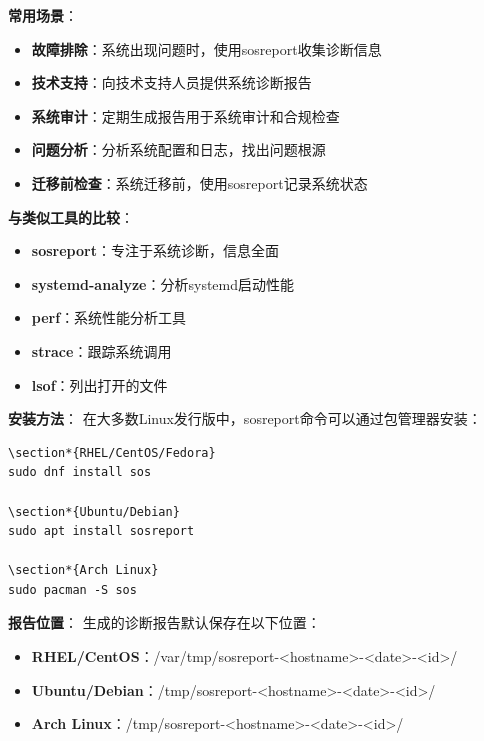 \documentclass[12pt,UTF8]{ctexbook}
\begin{document}
\textbf{常用场景}：
\begin{itemize}
    \item \textbf{故障排除}：系统出现问题时，使用sosreport收集诊断信息
    \item \textbf{技术支持}：向技术支持人员提供系统诊断报告
    \item \textbf{系统审计}：定期生成报告用于系统审计和合规检查
    \item \textbf{问题分析}：分析系统配置和日志，找出问题根源
    \item \textbf{迁移前检查}：系统迁移前，使用sosreport记录系统状态
\end{itemize}

\textbf{与类似工具的比较}：
\begin{itemize}
    \item \textbf{sosreport}：专注于系统诊断，信息全面
    \item \textbf{systemd-analyze}：分析systemd启动性能
    \item \textbf{perf}：系统性能分析工具
    \item \textbf{strace}：跟踪系统调用
    \item \textbf{lsof}：列出打开的文件
\end{itemize}

\textbf{安装方法}：
在大多数Linux发行版中，sosreport命令可以通过包管理器安装：

\begin{verbatim}
\section*{RHEL/CentOS/Fedora}
sudo dnf install sos

\section*{Ubuntu/Debian}
sudo apt install sosreport

\section*{Arch Linux}
sudo pacman -S sos
\end{verbatim}

\textbf{报告位置}：
生成的诊断报告默认保存在以下位置：
\begin{itemize}
    \item \textbf{RHEL/CentOS}：/var/tmp/sosreport-<hostname>-<date>-<id>/
    \item \textbf{Ubuntu/Debian}：/tmp/sosreport-<hostname>-<date>-<id>/
    \item \textbf{Arch Linux}：/tmp/sosreport-<hostname>-<date>-<id>/
\end{itemize}
\end{document}
